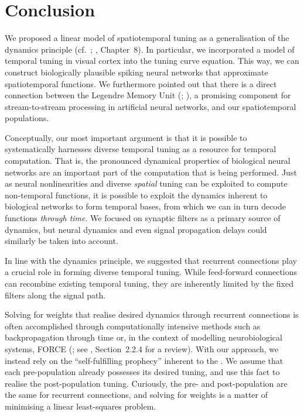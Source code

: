 
\section{Conclusion}
\label{sec:temporal_tuning_conclusion}

We proposed a linear model of spatiotemporal tuning as a generalisation of the \NEF dynamics principle (cf.~; \cite{eliasmith2003neural}, Chapter~8).
In particular, we incorporated a model of temporal tuning in visual cortex \citep[cf.][]{carandini1999linearity} into the \NEF tuning curve equation.
This way, we can construct biologically plausible spiking neural networks that approximate spatiotemporal functions.
We furthermore pointed out that there is a direct connection between the Legendre Memory Unit (\LMU; \cite{voelker2019lmu}), a promising component for stream-to-stream processing in artificial neural networks, and our spatiotemporal \NEF populations.

Conceptually, our most important argument is that it is possible to systematically harnesses diverse temporal tuning as a resource for temporal computation.
That is, the pronounced dynamical properties of biological neural networks are an important part of the computation that is being performed.
Just as neural nonlinearities and diverse \emph{spatial} tuning can be exploited to compute non-temporal functions, it is possible to exploit the dynamics inherent to biological networks to form temporal bases, from which we can in turn decode functions \emph{through time}.
We focused on synaptic filters as a primary source of dynamics, but neural dynamics and even signal propagation delays could similarly be taken into account.

In line with the \NEF dynamics principle, we suggested that recurrent connections play a crucial role in forming diverse temporal tuning.
While feed-forward connections can recombine existing temporal tuning, they are inherently limited by the fixed filters along the signal path.

Solving for weights that realise desired dynamics through recurrent connections is often accomplished through computationally intensive methods such as backpropagation through time \citep{werbos1990backpropagation} or, in the context of modelling neurobiological systems, FORCE (\cite{sussillo2009generating,nicola2017supervised}; see \cite{voelker2019}, Section~2.2.4 for a review).
With our approach, we instead rely on the \enquote{self-fulfilling prophecy} inherent to the \NEF.
We assume that each pre-population already possesses its desired tuning, and use this fact to realise the post-population tuning.
Curiously, the pre- and post-population are the same for recurrent connections, and solving for weights is a matter of minimising a linear least-squares problem.

